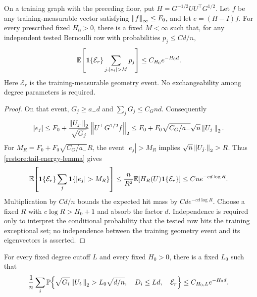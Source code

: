 \begin{corollary}
\label{restore:tail-hit-corollary}
On a training graph with the preceding floor, put
$H=G^{-1/2}UU^\top G^{1/2}$.
Let $f$ be any training-measurable vector satisfying
$\left\lVert f\right\rVert_\infty\le F_0$, and let $e=(H-I)f$.
For every prescribed fixed $H_0>0$, there is a fixed $M<\infty$
such that, for any independent tested Bernoulli row with probabilities
$p_j\le Cd/n$,
\begin{equation}
 \E\!\left[\ind{\mathcal E_r}
                 \sum_{j:|e_j|>M}p_j\right]
 \le C_{H_0}e^{-H_0d}.
 \label{restore:tail-hit-mass}
\end{equation}
Here $\mathcal E_r$ is the training-measurable geometry event.
No exchangeability among degree parameters is required.
\end{corollary}

\begin{proof}
On that event, $G_j\ge a_-d$ and $\sum_jG_j\le C_Gnd$.
Consequently
\[
 |e_j|
 \le F_0+\frac{\left\lVert U_{j\cdot}\right\rVert_2}{\sqrt{G_j}}
                  \left\lVert U^\top G^{1/2}f\right\rVert_2
 \le F_0+F_0\sqrt{C_G/a_-}\sqrt n\left\lVert U_{j\cdot}\right\rVert_2.
\]
For $M_R=F_0+F_0\sqrt{C_G/a_-}R$, the event
$|e_j|>M_R$ implies $\sqrt n\left\lVert U_{j\cdot}\right\rVert_2>R$.
Thus \cref{restore:tail-energy-lemma} gives
\begin{equation}
 \E\!\left[\ind{\mathcal E_r}
                    \sum_j\ind{|e_j|>M_R}\right]
 \le\frac n{R^2}\E[H_R(U)\ind{\mathcal E_r}]
 \le Cne^{-cd\log R}.
 \label{restore:tail-coefficient-count}
\end{equation}
Multiplication by $Cd/n$ bounds the expected hit mass by
$Cd e^{-cd\log R}$.
Choose a fixed $R$ with $c\log R>H_0+1$ and absorb the factor $d$.
Independence is required only to interpret the conditional probability
that the tested row hits the training exceptional set; no independence
between the training geometry event and its eigenvectors is asserted.
\end{proof}

\begin{corollary}
\label{restore:tail-target-corollary}
For every fixed degree cutoff $L$ and every fixed $H_0>0$, there is
a fixed $L_0$ such that
\begin{equation}
 \frac1n\sum_i\mathbb P\!\left\{
    \sqrt{G_i}\left\lVert U_{i\cdot}\right\rVert_2>L_0\sqrt{d/n},\quad
    D_i\le Ld,\quad \mathcal E_r\right\}
 \le C_{H_0,L}e^{-H_0d}.
 \label{restore:tail-target-mass}
\end{equation}
\end{corollary}

